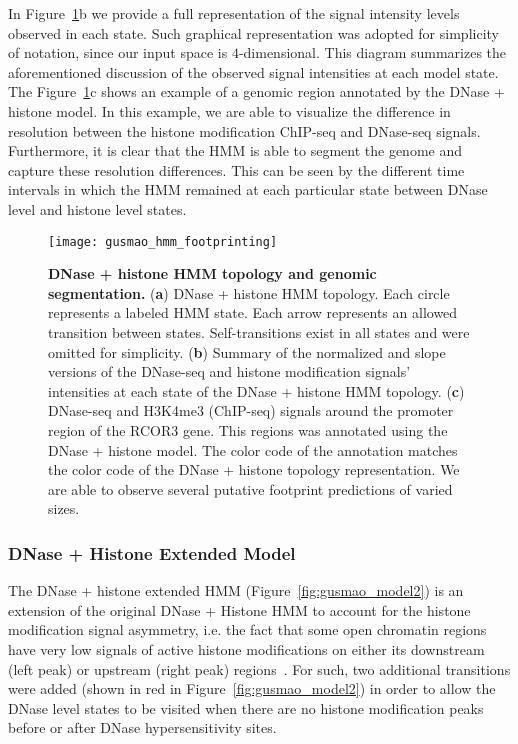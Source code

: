 In Figure~\ref{fig:gusmao_hmm_footprinting}b we provide a full representation of the signal intensity levels observed in each state. Such graphical representation was adopted for simplicity of notation, since our input space is $4$-dimensional. This diagram summarizes the aforementioned discussion of the observed signal intensities at each model state. The Figure~\ref{fig:gusmao_hmm_footprinting}c shows an example of a genomic region annotated by the DNase + histone model. In this example, we are able to visualize the difference in resolution between the histone modification ChIP-seq and DNase-seq signals. Furthermore, it is clear that the HMM is able to segment the genome and capture these resolution differences. This can be seen by the different time intervals in which the HMM remained at each particular state between DNase level and histone level states.

\begin{figure}[h!]
\centering
\texttt{[image: gusmao\_hmm\_footprinting]}
\caption[DNase + histone HMM topology and genomic segmentation]{\textbf{DNase + histone HMM topology and genomic segmentation.} (\textbf{a}) DNase + histone HMM topology. Each circle represents a labeled HMM state. Each arrow represents an allowed transition between states. Self-transitions exist in all states and were omitted for simplicity. (\textbf{b}) Summary of the normalized and slope versions of the DNase-seq and histone modification signals' intensities at each state of the DNase + histone HMM topology. (\textbf{c}) DNase-seq and H3K4me3 (ChIP-seq) signals around the promoter region of the RCOR3 gene. This regions was annotated using the DNase + histone model. The color code of the annotation matches the color code of the DNase + histone topology representation. We are able to observe several putative footprint predictions of varied sizes.}
\label{fig:gusmao_hmm_footprinting}
\end{figure}

\subsubsection{DNase + Histone Extended Model}

The DNase + histone extended HMM (Figure~\ref{fig:gusmao_model2}) is an extension of the original DNase + Histone HMM to account for the histone modification signal asymmetry, i.e. the fact that some open chromatin regions have very low signals of active histone modifications on either its downstream (left peak) or upstream  (right peak) regions~\cite{kundaje2012}. For such, two additional transitions were added (shown in red in Figure~\ref{fig:gusmao_model2}) in order to allow the DNase level states to be visited when there are no histone modification peaks before or after DNase hypersensitivity sites.

